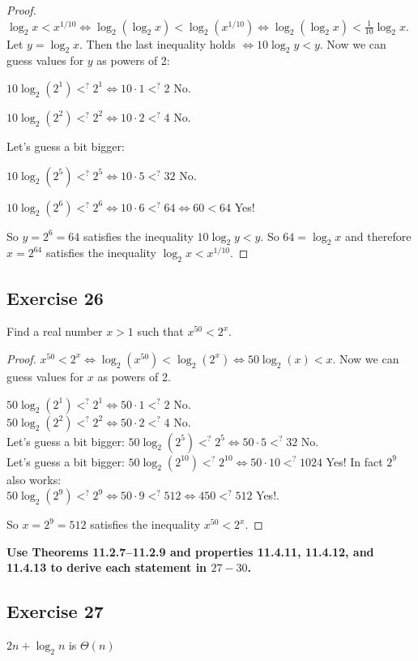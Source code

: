 \documentclass[14pt]{extarticle}
\newcommand{\cy}{\color{cyan}}
\begin{document}
\begin{proof}
\(\log_2 x < x^{1/10} \iff \log_2(\log_2 x) < \log_2(x^{1/10}) \iff \log_2(\log_2 x) < \frac{1}{10}\log_2 x\). Let \(y = 
\log_2 x\). Then the last inequality holds \(\iff 10 \log_2 y < y\). Now we can guess values for \(y\) as powers of 2:

\(10 \log_2(2^1) <^? 2^1 \iff 10 \cdot 1 <^? 2\) No. 

\(10 \log_2(2^2) <^? 2^2 \iff 10 \cdot 2 <^? 4\) No. 

Let's guess a bit bigger:

\(10 \log_2(2^5) <^? 2^5 \iff 10 \cdot 5 <^? 32\) No. 

\(10 \log_2(2^6) <^? 2^6 \iff 10 \cdot 6 <^? 64 \iff 60 < 64\) Yes! 

So \(y = 2^6 = 64\) satisfies the inequality \(10 \log_2 y < y\). So \(64 = \log_2 x\) and therefore \(x = 2^{64}\) 
satisfies the inequality \(\log_2 x < x^{1/10}\).
\end{proof}

\subsection{Exercise 26}
Find a real number \(x > 1\) such that \(x^{50} < 2^x\).

\begin{proof}
\(x^{50} < 2^x \iff \log_2(x^{50}) < \log_2(2^x) \iff 50 \log_2(x) < x\). Now we can guess values for \(x\) as powers 
of 2.

\(50 \log_2(2^1) <^? 2^1 \iff 50 \cdot 1 <^? 2\) No. \\
\(50 \log_2(2^2) <^? 2^2 \iff 50 \cdot 2 <^? 4\) No. \\
Let's guess a bit bigger:
\(50 \log_2(2^5) <^? 2^5 \iff 50 \cdot 5 <^? 32\) No. \\
Let's guess a bit bigger:
\(50 \log_2(2^{10}) <^? 2^{10} \iff 50 \cdot 10 <^? 1024\) Yes! In fact \(2^9\) also works: \\
\(50 \log_2(2^9) <^? 2^9 \iff 50 \cdot 9 <^? 512 \iff 450 <^? 512\) Yes!.

So \(x = 2^9 = 512\) satisfies the inequality \(x^{50} < 2^x\).
\end{proof}

{\bf \cy Use Theorems 11.2.7–11.2.9 and properties 11.4.11, 11.4.12, and 11.4.13 to derive each statement in \(27-30\).}

\subsection{Exercise 27}
\(2n + \log_2 n\) is \(\Theta(n)\)
\end{document}
